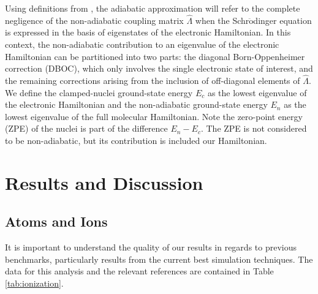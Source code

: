 \documentclass[pra,superscriptaddress,groupedaddress,twocolumn]{revtex4}
\begin{document}
Using definitions from \cite{Cederbaum_Review}, the adiabatic approximation will refer to the complete negligence of the non-adiabatic coupling matrix $\hat{\Lambda}$ when the Schr$\ddot{\text{o}}$dinger equation is expressed in the basis of eigenstates of the electronic Hamiltonian. In this context, the non-adiabatic contribution to an eigenvalue of the electronic Hamiltonian can be partitioned into two parts: the diagonal Born-Oppenheimer correction (DBOC), which only involves the single electronic state of interest, and the remaining corrections arising from the inclusion of off-diagonal elements of $\hat{\Lambda}$. We define the clamped-nuclei ground-state energy $E_c$ as the lowest eigenvalue of the electronic Hamiltonian and the non-adiabatic ground-state energy $E_n$ as the lowest eigenvalue of the full molecular Hamiltonian. Note the zero-point energy (ZPE) of the nuclei is part of the difference $E_n-E_c$. The ZPE is not considered to be non-adiabatic, but its contribution is included our Hamiltonian.

\section{Results and Discussion}



\subsection{Atoms and Ions}

It is important to understand the quality of our results in regards to previous benchmarks, particularly results from the current best simulation techniques. The data for this analysis and the relevant references are contained in Table \ref{tab:ionization}. 
\end{document}
